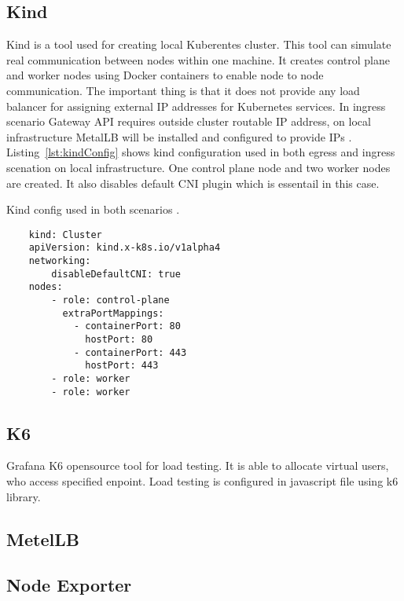 \subsection{Kind}
\label{sec:kind}

Kind is a tool used for creating local Kuberentes cluster. This tool can simulate real communication between nodes within one machine. It creates control plane and worker nodes using Docker containers to enable node to node communication. The important thing is that it does not provide any load balancer for assigning external IP addresses for Kubernetes services. In ingress scenario Gateway API requires outside cluster routable IP address, on local infrastructure MetalLB will be installed and configured to provide IPs \cite{Kind}. Listing~\ref{lst:kindConfig} shows kind configuration used in both egress and ingress scenation on local infrastructure. One control plane node and two worker nodes are created. It also disables default CNI plugin which is essentail in this case.

\begin{listing}[H]
    \centering
    \caption{Kind config used in both scenarios \cite{KindConfig}.}
    \begin{verbatim}
    kind: Cluster
    apiVersion: kind.x-k8s.io/v1alpha4
    networking:
        disableDefaultCNI: true
    nodes:
        - role: control-plane
          extraPortMappings:
            - containerPort: 80
              hostPort: 80
            - containerPort: 443
              hostPort: 443
        - role: worker
        - role: worker
    \end{verbatim}
    \label{lst:kindConfig}
\end{listing}

\subsection{K6}
\label{sec:k6}

Grafana K6 opensource tool for load testing. It is able to allocate virtual users, who access specified enpoint. Load testing is configured in javascript file using k6 library. %

\subsection{MetelLB}
\label{sec:metallb}

\subsection{Node Exporter}
\label{sec:nodeExporter}

